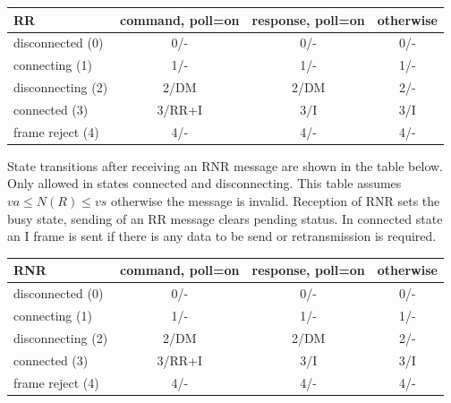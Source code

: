 \documentclass[a4paper]{article}
\begin{document}
{\footnotesize
\begin{center}
    \begin{tabular}{|l|c|c|c|}
        \hline
        RR                & command, poll=on & response, poll=on & otherwise  \\
        \hline
        disconnected (0)  & 0/-              & 0/-               & 0/-        \\
        \hline
        connecting (1)    & 1/-              & 1/-               & 1/-        \\
        \hline
        disconnecting (2) & 2/DM             & 2/DM              & 2/-        \\
        \hline
        connected (3)     & 3/RR+I           & 3/I               & 3/I        \\
        \hline
        frame reject (4)  & 4/-              & 4/-               & 4/-        \\
        \hline
    \end{tabular}
\end{center}
}

State transitions after receiving an RNR message are shown in the table below. Only allowed in states connected and
disconnecting. This table assumes $va \leq N(R) \leq vs$ otherwise the message is invalid. Reception of RNR sets the
busy state, sending of an RR message clears pending status. In connected state an I frame is sent if there is any data
to be send or retransmission is required.

{\footnotesize
\begin{center}
    \begin{tabular}{|l|c|c|c|}
        \hline
        RNR               & command, poll=on & response, poll=on & otherwise  \\
        \hline
        disconnected (0)  & 0/-              & 0/-               & 0/-        \\
        \hline
        connecting (1)    & 1/-              & 1/-               & 1/-        \\
        \hline
        disconnecting (2) & 2/DM             & 2/DM              & 2/-        \\
        \hline
        connected (3)     & 3/RR+I           & 3/I               & 3/I        \\
        \hline
        frame reject (4)  & 4/-              & 4/-               & 4/-        \\
        \hline
    \end{tabular}
\end{center}
}
\end{document}
